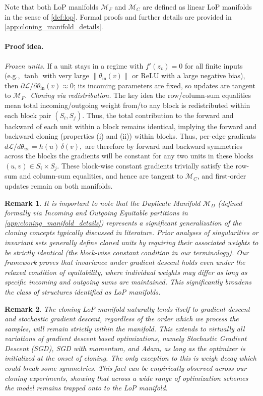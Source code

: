 \documentclass{article}
\newtheorem{remark}{Remark}[section]
\numberwithin{figure}{section}
\begin{document}
Note that both LoP manifolds $\mathcal{M}_F$ and $\mathcal{M}_C$ are defined as  linear LoP manifolds in the sense of \cref{def:lop}. Formal proofs and further details are provided in \cref{app:cloning_manifold_details}.

\vspace{-7pt}
\paragraph{Proof idea.}
\emph{Frozen units.} If a unit stays in a regime with $f'(z_v)=0$ for all finite inputs (e.g., $\tanh$ with very large $\lVert\theta_{\mathrm{in}}(v)\rVert$ or ReLU with a large negative bias), then $\partial \mathcal{L}/\partial \theta_{\mathrm{in}}(v)\approx 0$; its incoming parameters are fixed, so updates are tangent to $\mathcal{M}_F$.\
\emph{Cloning via redistribution.} The key idea the row/column-sum equalities mean total incoming/outgoing  weight from/to any block is redistributed within each block pair $(S_i,S_j)$. Thus, the total contribution to the forward and backward of each unit within a block remains identical, implying the forward and backward cloning (properties (i) and (ii)) within blocks. Thus, per-edge gradients $d\mathcal{L}/d\theta_{uv}=h(u)\,\delta(v),$ are therefore by forward and backward symmetries across the blocks the gradients will be constant for any two units in these blocks $(u,v)\in S_i\times S_j$. These block-wise constant gradients trivially satisfy the row-sum and column-sum equalities, and hence are tangent to $\mathcal{M}_C$, and first-order updates remain on both manifolds.
\begin{remark}
It is important to note that the Duplicate Manifold $\mathcal{M}_D$ (defined formally via Incoming and Outgoing Equitable partitions in \cref{app:cloning_manifold_details}) represents a significant generalization of the cloning concepts typically discussed in literature. Prior analyses of singularities \citep{fukumizu2000local} or invariant sets \citep{chen2023stochastic} generally define cloned units by requiring their associated weights to be strictly identical (the block-wise constant condition in our terminology). Our framework proves that invariance under gradient descent holds even under the relaxed condition of equitability, where individual weights may differ as long as specific incoming and outgoing sums are maintained. This significantly broadens the class of structures identified as LoP manifolds.
\end{remark}
\begin{remark}
The cloning LoP manifold naturally lends itself to gradient descent and stochastic gradient descent, regardless of the order which we process the samples, will remain strictly within the manifold. This extends to virtually all variations of gradient descent based optimizations, namely Stochastic Gradient Descent (SGD), SGD with momentum, and Adam, as long as the optimizer is initialized at the onset of cloning. The only exception to this is weigh decay which could break some symmetries. This fact can be empirically observed across our cloning experiments, showing that across a wide range of optimization schemes the model remains trapped onto to the LoP manifold.
\end{remark}
\end{document}
